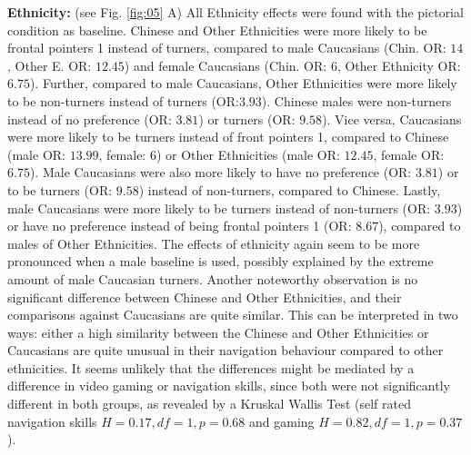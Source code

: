 \documentclass{frontiersSCNS} %
\begin{document}
\textbf{Ethnicity:} (see Fig. \ref{fig:05} A)
All Ethnicity effects were found with the pictorial condition as baseline. Chinese and Other Ethnicities were more likely to be frontal pointers 1 instead of turners, compared to male Caucasians (Chin. OR: $14$, Other E. OR: $12.45$) and female Caucasians (Chin. OR: $6$, Other Ethnicity OR: $6.75$). Further, compared to male Caucasians, Other Ethnicities were more likely to be non-turners instead of turners (OR:$3.93$). Chinese males were non-turners instead of no preference (OR: $3.81$) or turners (OR: $9.58$). Vice versa, Caucasians were more likely to be turners instead of front pointers 1, compared to Chinese (male OR: $13.99$, female: $6$) or Other Ethnicities (male OR: $12.45$, female OR: $6.75$). Male Caucasians were also more likely to have no preference (OR: $3.81$) or to be turners (OR: $9.58$) instead of non-turners, compared to Chinese. Lastly, male Caucasians were more likely to be turners instead of non-turners (OR: $3.93$) or have no preference instead of being frontal pointers 1 (OR: $8.67$), compared to males of Other Ethnicities.
The effects of ethnicity again seem to be more pronounced when a male baseline is used, possibly explained by the extreme amount of male Caucasian turners. Another noteworthy observation is no significant difference between Chinese and Other Ethnicities, and their comparisons against Caucasians are quite similar. This can be interpreted in two ways: either a high similarity between the Chinese and Other Ethnicities or  Caucasians are quite unusual in their navigation behaviour compared to other ethnicities. It seems unlikely that the differences might be mediated by a difference in video gaming or navigation skills, since both were not significantly different in both groups, as revealed by a Kruskal Wallis Test (self rated navigation skills $H=0.17, df=1, p = 0.68$ and gaming $H=0.82, df=1, p=0.37$).
\end{document}
